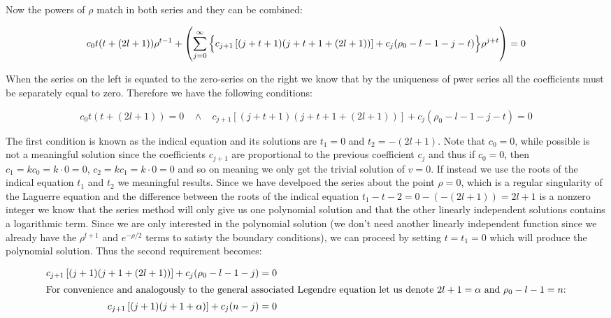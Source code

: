 \documentclass{article}
\begin{document}
    Now the powers of $\rho$ match in both series and they can be combined:
    
    \begin{equation}
        c_0t(t + (2l + 1))\rho^{t - 1} + \left(\sum_{j = 0}^{\infty}\Big\{c_{j+1}\left[(j + t + 1)(j + t + 1 + (2l + 1))\right] + c_j(\rho_{0} - l - 1 - j - t)\Big\}\rho^{j + t}\right) = 0 \\
    \end{equation}

    When the series on the left is equated to the zero-series on the right we know that by the uniqueness of pwer series all the coefficients must be separately equal to zero. Therefore we have
    the following conditions:

    \begin{equation}
        c_0t(t + (2l + 1)) = 0 \ \ \ \ \land \ \ \ \ c_{j+1}\left[(j + t + 1)(j + t + 1 + (2l + 1))\right] + c_j(\rho_{0} - l - 1 - j - t) = 0
    \end{equation}

    The first condition is known as the indical equation and its solutions are $t_1 = 0$ and $t_2 = -(2l + 1)$. Note that $c_0 = 0$, while possible is not a meaningful solution since the 
    coefficients $c_{j+1}$ are proportional to the previous coefficient $c_j$ and thus if $c_0 = 0$, then $c_1 = kc_0 = k\cdot0 = 0$, $c_2 = kc_1 = k\cdot0 = 0$ and so on meaning we only
    get the trivial solution of $v = 0$. If instead we use the roots of the indical equation $t_1$ and $t_2$ we meaningful results. Since we have develpoed the series about the point $\rho = 0$, which
    is a regular singularity of the Laguerre equation and the difference between the roots of the indical equation $t_1 - t-2 = 0 - (-(2l + 1)) = 2l + 1$ is a nonzero integer we know that
    the series method will only give us one polynomial solution and that the other linearly independent solutions contains a logarithmic term. Since we are only interested in the polynomial solution
    (we don't need another linearly independent function since we already have the $\rho^{l+1}$ and $e^{-\rho/2}$ terms to satisty the boundary conditions), we can proceed by setting $t = t_1 = 0$ which
    will produce the polynomial solution. Thus the second requirement becomes:

    \begin{align}
        c_{j + 1}\left[(j + 1)(j + 1 + (2l + 1))\right] + c_j(\rho_{0} - l - 1 - j) &= 0 \\
        \intertext{For convenience and analogously to the general associated Legendre equation let us denote $2l + 1 = \alpha$ and $\rho_{0} - l - 1 = n$:}
        c_{j + 1}\left[(j + 1)(j + 1 + \alpha)\right] + c_j(n - j) &= 0
    \end{align}
    
\end{document}

